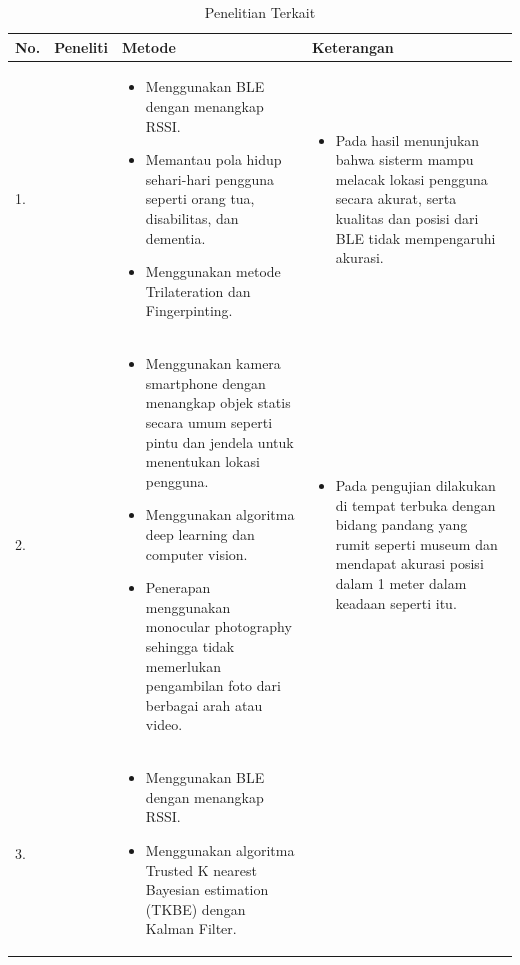 \begin{longtable}{| m{1cm} | m{2cm} | m{5cm} | m{5cm} |}
    \caption{Penelitian Terkait}
    \label{t_penelitian} \\
        \hline
        No. & Peneliti & Metode & Keterangan \\
        \hline
        1. & \citet{bai2020low} & 
        \begin{itemize}
            \item Menggunakan BLE dengan menangkap RSSI.
   			\item Memantau pola hidup sehari-hari pengguna seperti orang tua, disabilitas, dan dementia.
   			\item Menggunakan metode Trilateration dan Fingerpinting.
        \end{itemize} & 
        \begin{itemize}
            \item Pada hasil menunjukan bahwa sisterm mampu melacak lokasi pengguna secara akurat, serta kualitas dan posisi dari BLE tidak mempengaruhi akurasi.
        \end{itemize} \\
        \hline
        2. & \citet{xiao2018indoor} & 
        \begin{itemize}
            \item Menggunakan kamera smartphone dengan menangkap objek statis secara umum seperti pintu dan jendela untuk menentukan lokasi pengguna.
   			\item Menggunakan algoritma deep learning dan computer vision.
    		\item Penerapan menggunakan monocular photography sehingga tidak memerlukan pengambilan foto dari berbagai arah atau video.
        \end{itemize} & 
        \begin{itemize}
            \item Pada pengujian dilakukan di tempat terbuka dengan bidang pandang yang rumit seperti museum dan mendapat akurasi posisi dalam 1 meter dalam keadaan seperti itu.
        \end{itemize} \\
        \hline
        3. & \citet{yadav2019trusted} & 
        \begin{itemize}
            \item Menggunakan BLE dengan menangkap RSSI.
    		\item Menggunakan algoritma Trusted K nearest Bayesian estimation (TKBE) dengan Kalman Filter.

\end{itemize}
\end{longtable}
